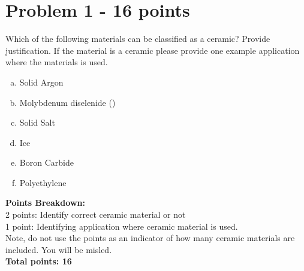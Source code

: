 \documentclass[12pt,letterpaper]{article}
\begin{document}
\section*{Problem 1 - 16 points}
Which of the following materials can be classified as a ceramic? Provide justification. If the material is a ceramic please provide one example application where the materials is used.

\begin{enumerate}[(a)]
    \item Solid Argon
    \item Molybdenum diselenide ()
    \item Solid Salt 
    \item Ice
    \item Boron Carbide 
    \item Polyethylene
\end{enumerate}

\textbf{Points Breakdown:}\\[12pt]
2 points: Identify correct ceramic material or not\\
1 point: Identifying application where ceramic material is used.\\
Note, do not use the points as an indicator of how many ceramic materials are included. You will be misled.\\[0.6pt]
\textbf{Total points: 16}
\end{document}
